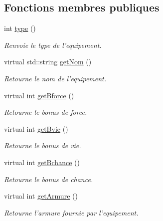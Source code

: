 \subsection*{Fonctions membres publiques}
\begin{DoxyCompactItemize}
\item 
int \hyperlink{class_jambe_a2a996cd6338e990408ef3394e4f05789}{type} ()
\begin{DoxyCompactList}\small\item\em Renvoie le type de l'equipement. \end{DoxyCompactList}\item 
virtual std\-::string \hyperlink{class_equipement_a0b0426a70bfce6e7c3efac605b75cd8e}{get\-Nom} ()
\begin{DoxyCompactList}\small\item\em Retourne le nom de l'equipement. \end{DoxyCompactList}\item 
virtual int \hyperlink{class_equipement_aabcf10fd762945fa4a37a9cf8321f463}{get\-Bforce} ()
\begin{DoxyCompactList}\small\item\em Retourne le bonus de force. \end{DoxyCompactList}\item 
virtual int \hyperlink{class_equipement_ad9fd7528c4f181970b7a0877f4145f89}{get\-Bvie} ()
\begin{DoxyCompactList}\small\item\em Retourne le bonus de vie. \end{DoxyCompactList}\item 
virtual int \hyperlink{class_equipement_a73485135eacdf30d5f49c9e34e5f4d0e}{get\-Bchance} ()
\begin{DoxyCompactList}\small\item\em Retourne le bonus de chance. \end{DoxyCompactList}\item 
virtual int \hyperlink{class_equipement_a8577d49fd00b8effa39388feccb29901}{get\-Armure} ()
\begin{DoxyCompactList}\small\item\em Retourne l'armure fournie par l'equipement. \end{DoxyCompactList}\end{DoxyCompactItemize}
